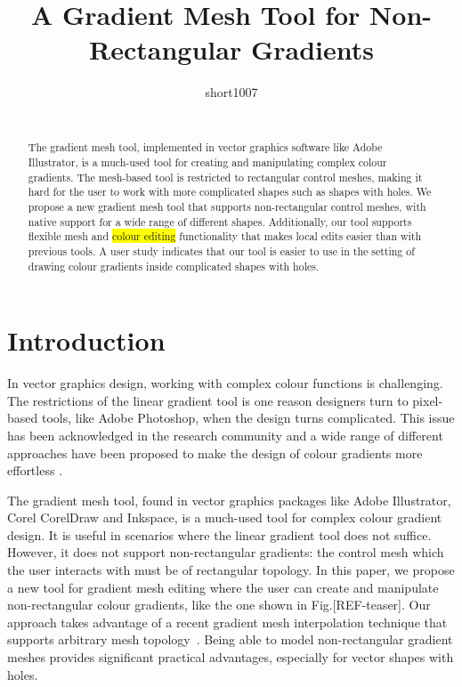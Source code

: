 \documentclass{egpubl}
\title[Non-rectangular gradient mesh tool]
{A Gradient Mesh Tool for Non-Rectangular Gradients}
\author[short1007]
{\parbox{\textwidth}{\centering short1007}
	\\
	{\parbox{\textwidth}{\centering } }
}
\begin{document}
	
	
	\maketitle
	
	\begin{abstract}
		The gradient mesh tool, implemented in vector graphics software like Adobe Illustrator, is a much-used tool for creating and manipulating complex colour gradients. The mesh-based tool is restricted to rectangular control meshes, making it hard for the user to work with more complicated shapes such as shapes with holes. We propose a new gradient mesh tool that supports non-rectangular control meshes, with native support for a wide range of different shapes. Additionally, our tool supports flexible mesh and \colorbox{yellow}{colour editing} functionality that makes local edits easier than with previous tools. A user study indicates that our tool is easier to use in the setting of drawing colour gradients inside complicated shapes with holes.
		
		\begin{classification} %
		\end{classification}
		
	\end{abstract}
	
	\section{Introduction}
	\label{sec:intro}
	
	In vector graphics design, working with complex colour functions is challenging. The restrictions of the linear gradient tool is one reason designers turn to pixel-based tools, like Adobe Photoshop, when the design turns complicated. This issue has been acknowledged in the research community and a wide range of different approaches have been proposed to make the design of colour gradients more effortless \cite{Orzan:2008,Lopez-Moreno:2013, Vergne:2012, Shao:2012}.
	
	The gradient mesh tool, found in vector graphics packages like Adobe Illustrator, Corel CorelDraw and Inkspace, is a much-used tool for complex colour gradient design.	It is useful in scenarios where the linear gradient tool does not suffice. However, it does not support non-rectangular gradients: the control mesh which the user interacts with must be of rectangular topology. In this paper, we propose a new tool for gradient mesh editing where the user can create and manipulate non-rectangular colour gradients, like the one shown in Fig.[REF-teaser]. Our approach takes advantage of a recent gradient mesh interpolation technique that supports arbitrary mesh topology~\cite{Lieng:2016}. Being able to model non-rectangular gradient meshes provides significant practical advantages, especially for vector shapes with holes.
	
\end{document}
